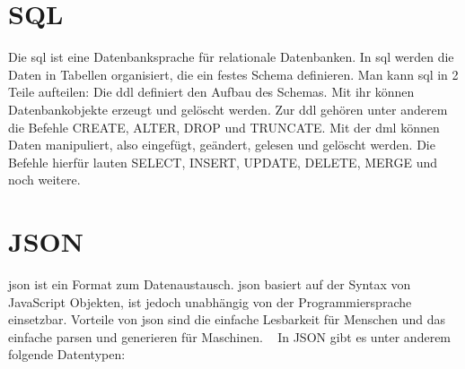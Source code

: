 \section{SQL}
\label{sec:sql}

Die \ac{sql} ist eine Datenbanksprache für relationale Datenbanken.
In \ac{sql} werden die Daten in Tabellen organisiert, die ein festes Schema definieren.
Man kann \ac{sql} in 2 Teile aufteilen:
Die \ac{ddl} definiert den Aufbau des Schemas.
Mit ihr können Datenbankobjekte erzeugt und gelöscht werden.
Zur \ac{ddl} gehören unter anderem die Befehle CREATE, ALTER, DROP und TRUNCATE\@.
Mit der \ac{dml} können Daten manipuliert, also eingefügt, geändert, gelesen und gelöscht werden.
Die Befehle hierfür lauten SELECT, INSERT, UPDATE, DELETE, MERGE und noch weitere.
~\autocite{schicker:datenbanken}

\section{JSON}
\label{sec:json}

\ac{json} ist ein Format zum Datenaustausch.
\ac{json} basiert auf der Syntax von JavaScript Objekten, ist jedoch unabhängig von der Programmiersprache einsetzbar.
Vorteile von \ac{json} sind die einfache Lesbarkeit für Menschen und das einfache parsen und generieren für Maschinen.
~\autocite{json:json}
In JSON gibt es unter anderem folgende Datentypen:

